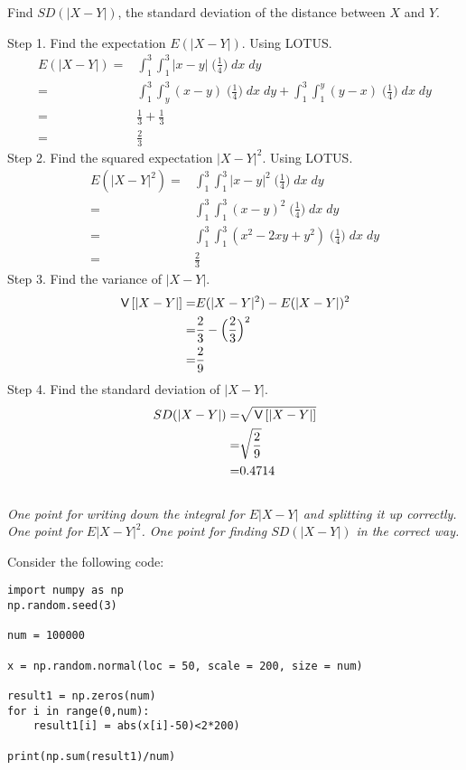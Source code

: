 \begin{exercise}[3]
Find $SD(|X-Y|)$, the standard deviation of the distance between $X$ and $Y$.
\begin{solution}
Step 1. Find the expectation $E(|X-Y|)$. Using LOTUS.
\begin{align*}
    E(|X-Y|) =& \int_1^3 \int_1^3 |x-y| \; \Big(\frac{1}{4}\Big) \; dx \; dy \\
      =& \int_1^3 \int_y^3 (x-y) \; \Big(\frac{1}{4}\Big) \; dx \; dy + \int_1^3 \int_1^y (y-x) \; \Big(\frac{1}{4}\Big) \; dx \; dy \\
      =& \frac{1}{3} + \frac{1}{3} \\
      =& \frac{2}{3}
\end{align*}
Step 2. Find the squared expectation $|X-Y|^2$. Using LOTUS.
\begin{align*}
    E(|X-Y|^2) =& \int_1^3 \int_1^3 |x-y|^2 \; \Big(\frac{1}{4}\Big) \; dx \; dy \\
    =& \int_1^3 \int_1^3 (x-y)^2 \; \Big(\frac{1}{4}\Big) \; dx \; dy \\
    =& \int_1^3 \int_1^3 (x^2- 2xy + y^2) \; \Big(\frac{1}{4}\Big) \; dx \; dy \\
    =& \frac{2}{3}
\end{align*}
Step 3. Find the variance of $|X-Y|$.
\begin{align*}
    \,\mathsf{V}\left[|X-Y|\right] =& E(|X-Y|^2) - E(|X-Y|)^2 \\
        =& \frac{2}{3} - \Big(\frac{2}{3}\Big)^2 \\
        =& \frac{2}{9}
\end{align*}
Step 4. Find the standard deviation of $|X-Y|$.
\begin{align*}
    SD(|X-Y|) =& \sqrt{\,\mathsf{V}\left[|X-Y|\right]} \\
    =& \sqrt{\frac{2}{9}}\\
    =& 0.4714
\end{align*} \\
\textit{One point for writing down the integral for $E|X-Y|$ and splitting it up correctly. One point for $E|X-Y|^2$. One point for finding $SD(|X-Y|)$ in the correct way.}
\end{solution}
\end{exercise}
\noindent Consider the following code:
\begin{verbatim}
import numpy as np
np.random.seed(3)

num = 100000

x = np.random.normal(loc = 50, scale = 200, size = num)

result1 = np.zeros(num)
for i in range(0,num):
    result1[i] = abs(x[i]-50)<2*200)

print(np.sum(result1)/num)
\end{verbatim}

